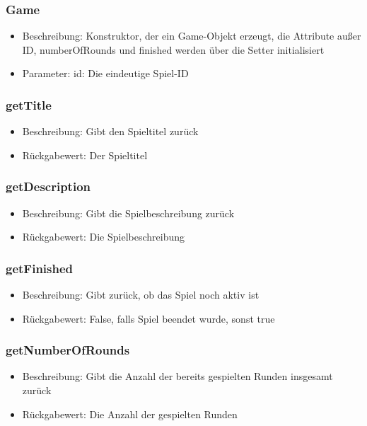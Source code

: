 \documentclass[a4paper]{scrreprt}
\begin{document}
	\subsubsection{Game}
	\begin{itemize}
		\item Beschreibung: Konstruktor, der ein Game-Objekt erzeugt, die Attribute außer ID, numberOfRounds und finished werden über die Setter initialisiert
		\item Parameter: id: Die eindeutige Spiel-ID
	\end{itemize}

	\subsubsection{getTitle}
	\begin{itemize}
		\item Beschreibung: Gibt den Spieltitel zurück
		\item Rückgabewert: Der Spieltitel
	\end{itemize}
	\subsubsection{getDescription}
	\begin{itemize}
		\item Beschreibung: Gibt die Spielbeschreibung zurück
		\item Rückgabewert: Die Spielbeschreibung
	\end{itemize}
	\subsubsection{getFinished}
	\begin{itemize}
		\item Beschreibung: Gibt zurück, ob das Spiel noch aktiv ist
		\item Rückgabewert: False, falls Spiel beendet wurde, sonst true
	\end{itemize}
	\subsubsection{getNumberOfRounds}
	\begin{itemize}
		\item Beschreibung: Gibt die Anzahl der bereits gespielten Runden insgesamt zurück
		\item Rückgabewert: Die Anzahl der gespielten Runden
	\end{itemize}
\end{document}
